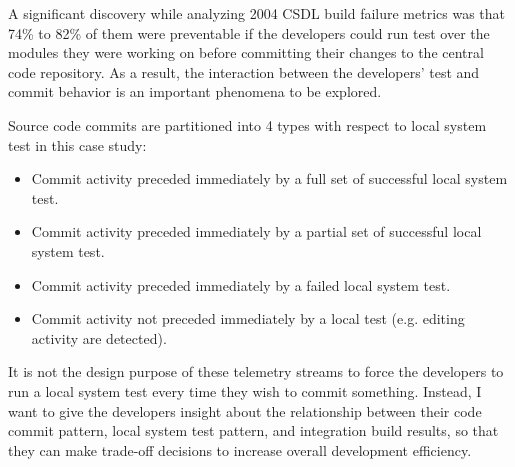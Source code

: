\begin{enumerate}
A significant discovery while analyzing 2004 CSDL build failure metrics was that 74\% to 82\% of them were preventable if the developers could run test over the modules they were working on before committing their changes to the central code repository. As a result, the interaction between the developers' test and commit behavior is an important phenomena to be explored. 

Source code commits are partitioned into 4 types with respect to local system test in this case study:
\begin{itemize}
	\item Commit activity preceded immediately by a full set of successful local system test.
  \item Commit activity preceded immediately by a partial set of successful local system test.
	\item Commit activity preceded immediately by a failed local system test.
	\item Commit activity not preceded immediately by a local test (e.g. editing activity are detected).
\end{itemize}

It is not the design purpose of these telemetry streams to force the developers to run a local system test every time they wish to commit something. Instead, I want to give the developers insight about the relationship between their code commit pattern, local system test pattern, and integration build results, so that they can make trade-off decisions to increase overall development efficiency.



\end{enumerate}
